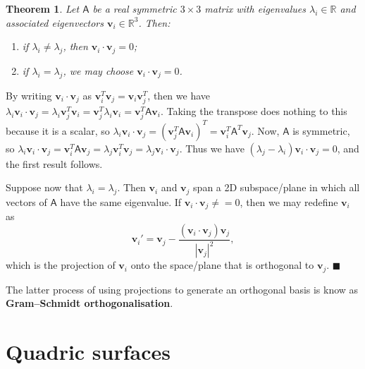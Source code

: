\documentclass[letter-paper]{tufte-book}
\newtheorem{theorem}{\color{pastel-blue}Theorem}[section]
\newenvironment{proof}[1][Proof]{\begin{trivlist}
\item[\hskip \labelsep {\bfseries #1}]}{\end{trivlist}}
\newcommand{\vb}{\boldsymbol{v}}
\newcommand\Def[1]{\textbf{#1}}
\newcommand{\qed}{\hfill$\blacksquare$}
\begin{document}
\begin{theorem}
	Let $\mathsf{A}$ be a real symmetric $3\times3$ matrix with eigenvalues
	$\lambda_i\in\mathbb{R}$ and associated eigenvectors $\vb_i
	\in\mathbb{R}^3$. Then:
	\begin{enumerate}
		\item if $\lambda_i \neq \lambda_j$, then $\vb_i \cdot \vb_j = 0$;
		\item if $\lambda_i = \lambda_j$, we may choose $\vb_i \cdot \vb_j = 0$.
	\end{enumerate}
\end{theorem}
\begin{proof}
	By writing $\vb_i \cdot \vb_j$ as $\vb_i^T \vb_j = \vb_i \vb_j^T$, then we
	have $\lambda_i \vb_i\cdot\vb_j = \lambda_i \vb_j^T \vb_i = \vb_j^T
	\lambda_i \vb_i = \vb_j^T \mathsf{A}\vb_i$. Taking the transpose does
	nothing to this because it is a scalar, so $\lambda_i \vb_i \cdot \vb_j =
	(\vb_j^T \mathsf{A} \vb_i)^T = \vb_i^T \mathsf{A}^T \vb_j$. Now,
	$\mathsf{A}$ is symmetric, so $\lambda_i \vb_i \cdot \vb_j = \vb_i^T
	\mathsf{A} \vb_j = \lambda_j \vb_i^T \vb_j = \lambda_j \vb_i\cdot \vb_j$.
	Thus we have $(\lambda_j-\lambda_i)\vb_i \cdot\vb_j =0$, and the first
	result follows.
	
	Suppose now that $\lambda_i = \lambda_j$. Then $\vb_i$ and $\vb_j$ span a 2D
	subspace/plane in which all vectors of $\mathsf{A}$ have the same
	eigenvalue. If $\vb_i\cdot\vb_j \neq=0$, then we may redefine $\vb_i$ as
	\begin{equation*}
		\vb_i' = \vb_j-\frac{(\vb_i \cdot \vb_j)\vb_j}{|\vb_j|^2},
	\end{equation*}
	which is the projection of $\vb_i$ onto the space/plane that is orthogonal
	to $\vb_j$. \qed
\end{proof}
The latter process of using projections to generate an orthogonal basis is know
as \Def{Gram--Schmidt orthogonalisation}.


\section{Quadric surfaces}
\end{document}
